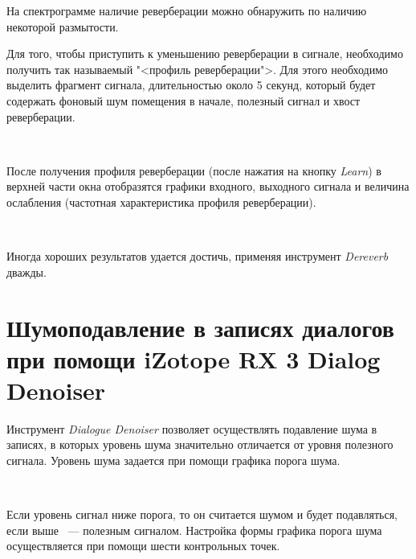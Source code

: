 \documentclass{beamer}
\begin{document}
\begin{frame}
На спектрограмме наличие реверберации можно обнаружить по наличию некоторой размытости. 

\end{frame}

\begin{frame}
Для того, чтобы приступить к уменьшению реверберации в сигнале, необходимо получить так называемый "<профиль реверберации">. Для этого необходимо выделить фрагмент сигнала, длительностью около 5 секунд, который будет содержать фоновый шум помещения в начале, полезный сигнал и хвост реверберации.

~

После получения профиля реверберации (после нажатия на кнопку \textit{Learn}) в верхней части окна отобразятся графики входного, выходного сигнала и величина ослабления (частотная характеристика профиля реверберации). 

~

Иногда хороших результатов удается достичь, применяя инструмент \emph{Dereverb} дважды.
\end{frame}

\section[Шумоподавление в записях диалогов]{Шумоподавление в записях диалогов при помощи iZotope RX 3 Dialog Denoiser}
\begin{frame}
Инструмент \emph{Dialogue Denoiser} позволяет осуществлять подавление шума в записях, в которых уровень шума значительно отличается от уровня полезного сигнала. Уровень шума задается при помощи графика порога шума. 

~

Если уровень сигнал ниже порога, то он считается шумом и будет подавляться, если выше ~--- полезным сигналом. Настройка формы графика порога шума осуществляется при помощи шести контрольных точек.
\end{frame}
\end{document}
